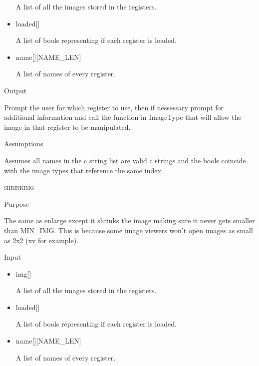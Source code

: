 \documentclass[pdftex, 11pt]{article}
\begin{document}
\begin{description}
\begin{description}
\begin{itemize}
						A list of all the images stored in the registers.

					\item{loaded[]}

						A list of bools representing if each register is loaded.

					\item{name[][NAME\_LEN]}

						A list of names of every register.

				\end{itemize}

			\item{Output}

				Prompt the user for which register to use, then if nessessary
				prompt for additional information and call the function
				in ImageType that will allow the image in that register to
				be manipulated.

			\item{Assumptions}

				Assumes all names in the c string list are valid c
				strings and the bools coincide with the image types that
				reference the same index.

		\end{description}



	\item{\textsc{shrinkimg}}
		\begin{description}
			\item{Purpose}

				The same as enlarge except it shrinks the image making sure it never gets
				smaller than MIN\_IMG.  This is because some image viewers won't open images
				as small as 2x2 (xv for example).

			\item{Input}

				\begin{itemize}

					\item{img[]}

						A list of all the images stored in the registers.

					\item{loaded[]}

						A list of bools representing if each register is loaded.

					\item{name[][NAME\_LEN]}

						A list of names of every register.


\end{itemize}
\end{description}
\end{description}
\end{document}
